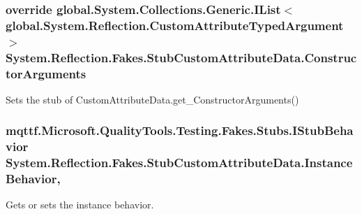 \hypertarget{class_system_1_1_reflection_1_1_fakes_1_1_stub_custom_attribute_data_a972bc18bb8e837fae6ce67a1703baeba}{
\subsubsection[{Constructor\-Arguments}]{\setlength{\rightskip}{0pt plus 5cm}override global.\-System.\-Collections.\-Generic.\-I\-List$<$global.\-System.\-Reflection.\-Custom\-Attribute\-Typed\-Argument$>$ System.\-Reflection.\-Fakes.\-Stub\-Custom\-Attribute\-Data.\-Constructor\-Arguments\hspace{0.3cm}{\ttfamily [get]}}}\label{class_system_1_1_reflection_1_1_fakes_1_1_stub_custom_attribute_data_a972bc18bb8e837fae6ce67a1703baeba}


Sets the stub of Custom\-Attribute\-Data.\-get\-\_\-\-Constructor\-Arguments()

\hypertarget{class_system_1_1_reflection_1_1_fakes_1_1_stub_custom_attribute_data_a6502c388ae7c6eca608011c286852847}{
\subsubsection[{Instance\-Behavior}]{\setlength{\rightskip}{0pt plus 5cm}mqttf.\-Microsoft.\-Quality\-Tools.\-Testing.\-Fakes.\-Stubs.\-I\-Stub\-Behavior System.\-Reflection.\-Fakes.\-Stub\-Custom\-Attribute\-Data.\-Instance\-Behavior\hspace{0.3cm}{\ttfamily [get]}, {\ttfamily [set]}}}\label{class_system_1_1_reflection_1_1_fakes_1_1_stub_custom_attribute_data_a6502c388ae7c6eca608011c286852847}


Gets or sets the instance behavior.

